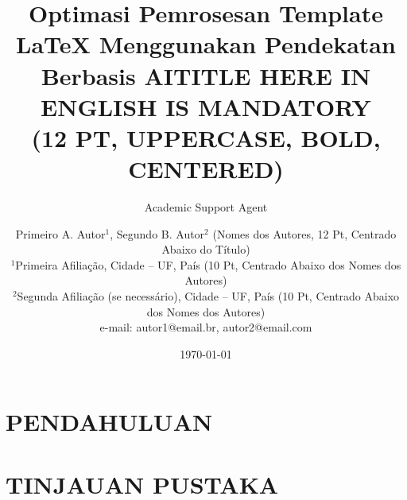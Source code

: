 \documentclass{sobraep}
\title{Optimasi Pemrosesan Template LaTeX Menggunakan Pendekatan Berbasis AI}
\author{Academic Support Agent}
\date{\today}
\begin{document}
\maketitle

\begin{abstract}

\end{abstract}

\chapter{PENDAHULUAN}


\chapter{TINJAUAN PUSTAKA}





\title{TITLE HERE IN ENGLISH IS MANDATORY \\ (12 PT, UPPERCASE, BOLD, CENTERED)}


\author{Primeiro A. Autor$^{1}$, Segundo B. Autor$^{2}$ (Nomes dos Autores, 12 Pt, Centrado Abaixo do Título)\\
	\normalsize $^{1}$Primeira Afiliação, Cidade -- UF, País (10 Pt, Centrado Abaixo dos Nomes dos Autores)\\
	\normalsize $^{2}$Segunda Afiliação (se necessário), Cidade -- UF, País (10 Pt, Centrado Abaixo dos Nomes dos Autores)\\
	\normalsize e-mail: autor1@email.br, autor2@email.com
}
\end{document}
